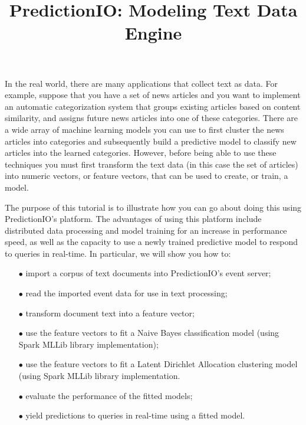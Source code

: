\documentclass[a4paper,12pt]{article}
\renewcommand{\bf}[1]{\textbf{#1}}
\newcommand{\3}{\left}
\newcommand{\4}{\right}
\renewcommand{\-}[1]{{}^{-#1}}
\begin{document}
\title{\vspace{-1.5 cm}\bf{PredictionIO: Modeling Text Data Engine}}
\author{\vspace{-2cm}}
\date{}
\maketitle


In the real world, there are many applications that collect text as data. For example, suppose that you have a set of news articles and you want to implement an automatic categorization system that groups existing articles based on content similarity, and assigns future news articles into one of these categories. There are a wide array of machine learning models you can use to first cluster the news articles into categories and subsequently build a predictive model to classify new articles into the learned categories. However, before being able to use these techniques you must first transform the text data (in this case the set of articles) into numeric vectors, or feature vectors, that can be used to create, or train, a model.

The purpose of this tutorial is to illustrate how you can go about doing this using PredictionIO's platform. The advantages of using this platform include distributed data processing and model training for an increase in performance speed, as well as the capacity to use a newly trained predictive model to respond to queries in real-time. In particular, we will show you how to:

\begin{itemize}
\item[$\bullet$]{import a corpus of text documents into PredictionIO's event server;}

\item[$\bullet$]{read the imported event data for use in text processing;}

\item[$\bullet$]{transform document text into a feature vector;}

\item[$\bullet$]{use the feature vectors to fit a Naive Bayes classification model (using Spark MLLib library implementation);}

\item[$\bullet$]{use the feature vectors to fit a Latent Dirichlet Allocation clustering model (using Spark MLLib library implementation.}

\item[$\bullet$]{evaluate the performance of the fitted models;}

\item[$\bullet$]{yield predictions to queries in real-time using a fitted model.}
\end{itemize}
\end{document}
